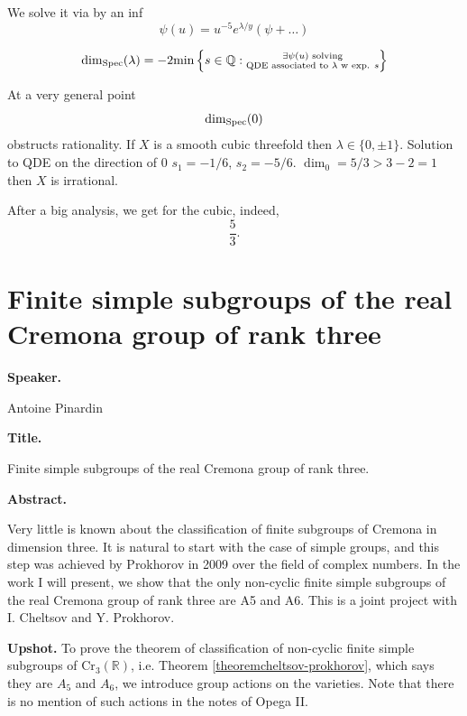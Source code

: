 We solve it via by an inf
$$
\psi(u) = u^{-5}e^{\lambda/y}
(\psi+…)
$$
\begin{definition}
\label{definition-dim-spec}
$$
\dim_{\mathop{\mathrm{Spec}}}(\lambda)
=-2\text{min}\left\{
s \in \mathbb{Q}:
\substack{\exists \psi(u)
\text{ solving} \\ \text{QDE
associated to $\lambda$ w exp. $s$}}\right\}
$$

\begin{theorem}[inf]
\label{theorem-inf2}
At a very general point
$$
\dim_{\mathop{\mathrm{Spec}}}(0)
$$
obstructs rationality.
If $X$ is a smooth cubic threefold
then $\lambda \in \{0 , \pm 1\}$.
Solution to QDE on the direction of $0$
$s_1=-1/6$, $s_2=-5/6$.
$\dim_0 = 5/3>3-2=1$ then $X$ is irrational.
\end{theorem}

\end{definition}

After a big analysis, we get for
the cubic, indeed,
$$
\frac{5}{3}.
$$

\section{Finite simple subgroups of the
real Cremona group of rank three}
\label{section-finite-simple-subgroups-real-
cremona-group-rank-three}

\medskip\noindent
{\bf Speaker.}

Antoine Pinardin

\medskip\noindent
{\bf Title.}

Finite simple subgroups of the real
Cremona group of rank three.

\medskip\noindent
{\bf Abstract.}

Very little is known about the
classification of finite subgroups of
Cremona in dimension three. It is
natural to start with the case of
simple groups, and this step was
achieved by Prokhorov in 2009 over the
field of complex numbers. In the work
I will present, we show that the only
non-cyclic finite simple subgroups of
the real Cremona group of rank three
are A5 and A6. This is a joint
project with I. Cheltsov and
Y. Prokhorov.

\medskip\noindent
{\bf Upshot.} To prove the theorem
of classification of non-cyclic finite simple
subgroups of
$\text{Cr}_3(\mathbb{R})$,
i.e. Theorem \ref{theoremcheltsov-prokhorov},
which says they are $A_5$ and $A_6$,
we introduce group actions on the varieties.
Note that there is no mention of such
actions in the notes of Opega II.

